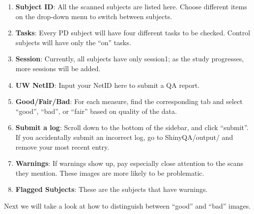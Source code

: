 \documentclass{article}
\begin{document}
\begin{enumerate}
	\item \textbf{Subject ID}: All the scanned subjects are listed here. Choose different items on the drop-down menu to switch between subjects.
	\item \textbf{Tasks}: Every PD subject will have four different tasks to be checked. Control subjects will have only the ``on'' tasks. 
	\item \textbf{Session}: Currently, all subjects have only session1; as the study progresses, more sessions will be added. 
	\item \textbf{UW NetID}: Input your NetID here to submit a QA report.
	\item \textbf{Good/Fair/Bad}: For each measure, find the corresponding tab and select ``good'', ``bad'', or ``fair'' based on quality of the data. 
	\item \textbf{Submit a log}: Scroll down to the bottom of the sidebar, and click ``submit''. If you accidentally submit an incorrect log, go to ShinyQA/output/ and remove your most recent entry. 
	\item \textbf{Warnings}: If warnings show up, pay especially close attention to the scans they mention. These images are more likely to be problematic.
	\item \textbf{Flagged Subjects}: These are the subjects that have warnings. 
\end{enumerate}
Next we will take a look at how to distinguish between ``good'' and ``bad'' images. 
\end{document}
